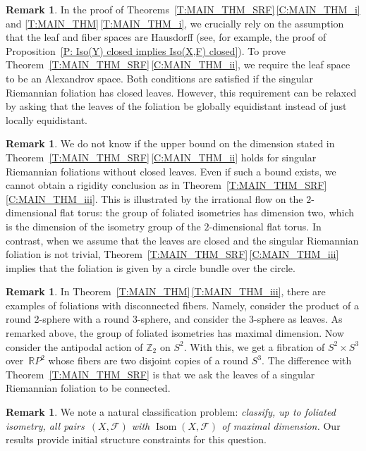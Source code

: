 \documentclass[10pt,a4paper]{amsart}
\numberwithin{equation}{section}
\theoremstyle{definition}
\newtheorem{rem}[thm]{Remark}
\DeclareMathOperator{\Iso}{Isom}
\newcommand{\R}{\mathbb{R}} %
\newcommand{\Z}{\mathbb{Z}} %
\newcommand{\fol}{\mathcal{F}}
\begin{document}
\begin{rem}
In the proof of Theorems~\ref{T:MAIN_THM_SRF}\,\ref{C:MAIN_THM_i} and \ref{T:MAIN_THM}\,\ref{T:MAIN_THM_i}, we crucially rely on the assumption that the leaf and fiber spaces are Hausdorff (see, for example, the proof of Proposition~\ref{P: Iso(Y) closed implies Iso(X,F) closed}).
To prove Theorem~\ref{T:MAIN_THM_SRF}\,\ref{C:MAIN_THM_ii}, we require the leaf space to be an Alexandrov space. Both conditions are satisfied if the singular Riemannian foliation has closed leaves. However, this requirement can be relaxed by asking that the leaves of the foliation be globally equidistant instead of just locally equidistant.
\end{rem}

\begin{rem}
We do not know if the upper bound on the dimension stated in Theorem~\ref{T:MAIN_THM_SRF}\,\ref{C:MAIN_THM_ii} holds for singular Riemannian foliations without closed leaves. Even if such a bound exists, we cannot obtain a rigidity conclusion as in Theorem~\ref{T:MAIN_THM_SRF}\,\ref{C:MAIN_THM_iii}. This is illustrated by the irrational flow on the $2$-dimensional flat torus: the group of foliated isometries has dimension two, which is the dimension of the isometry group of the $2$-dimensional flat torus. In contrast, when we assume that the leaves are closed and the singular Riemannian foliation is not trivial, Theorem~\ref{T:MAIN_THM_SRF}\,\ref{C:MAIN_THM_iii} implies that the foliation is given by a circle bundle over the circle.
\end{rem}

\begin{rem}
In Theorem~\ref{T:MAIN_THM}\,\ref{T:MAIN_THM_iii}, there are examples of foliations with disconnected fibers. Namely, consider the product of a round $2$-sphere with a round $3$-sphere, and consider the $3$-sphere as leaves. As remarked above, the group of foliated isometries has maximal dimension. Now consider the antipodal action of $\Z_2$ on $S^2$. With this, we get a fibration of $S^2\times S^3$ over~$\R P^2$ whose fibers are two disjoint copies of a round $S^3$. The difference with Theorem~\ref{T:MAIN_THM_SRF} is that we ask the leaves of a singular Riemannian foliation to be connected.
\end{rem}

\begin{rem}
\label{R:classification.problem}
 We note a natural classification problem: \emph{classify, up to foliated isometry, all pairs~$(X,\fol)$ with $\Iso(X,\fol)$ of maximal dimension.} Our results provide initial structure constraints for this question.
\end{rem}
\end{document}

